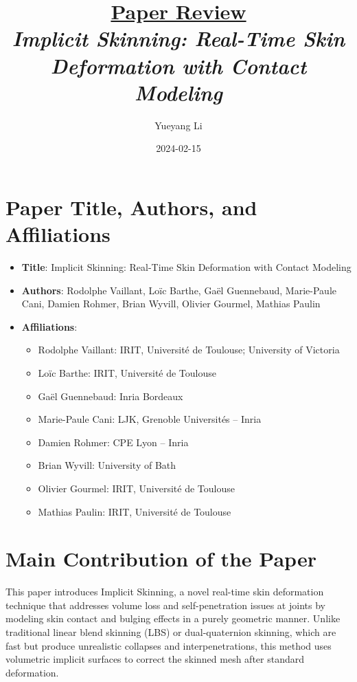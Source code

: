 \documentclass[12pt]{article}
\newcommand{\paperTitle}{
    \textit{\normalsize{Implicit Skinning: Real-Time Skin Deformation with Contact Modeling}}
}
\begin{document}
\title{\Large\uline{\textbf{Paper Review}} \\[0.4em]
\paperTitle{} 
}
\author{Yueyang Li}
\date{2024-02-15}

\maketitle

\section{Paper Title, Authors, and Affiliations}
\begin{itemize}[noitemsep]
    \item \textbf{Title}: Implicit Skinning: Real-Time Skin Deformation with Contact Modeling
    \item \textbf{Authors}: Rodolphe Vaillant, Loïc Barthe, Gaël Guennebaud, Marie-Paule Cani, Damien Rohmer, Brian Wyvill, Olivier Gourmel, Mathias Paulin
    \item \textbf{Affiliations}:
    \begin{itemize}[noitemsep]
        \item Rodolphe Vaillant: IRIT, Université de Toulouse; University of Victoria
        \item Loïc Barthe: IRIT, Université de Toulouse
        \item Gaël Guennebaud: Inria Bordeaux
        \item Marie-Paule Cani: LJK, Grenoble Universités – Inria
        \item Damien Rohmer: CPE Lyon – Inria
        \item Brian Wyvill: University of Bath
        \item Olivier Gourmel: IRIT, Université de Toulouse
        \item Mathias Paulin: IRIT, Université de Toulouse
    \end{itemize}
\end{itemize}

\section{Main Contribution of the Paper}
This paper introduces Implicit Skinning, a novel real-time skin deformation technique that addresses volume loss and self-penetration issues at joints by modeling skin contact and bulging effects in a purely geometric manner. Unlike traditional linear blend skinning (LBS) or dual-quaternion skinning, which are fast but produce unrealistic collapses and interpenetrations, this method uses volumetric implicit surfaces to correct the skinned mesh after standard deformation.
\end{document}
